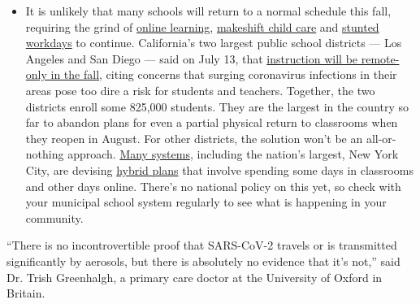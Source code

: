 \begin{itemize}
  \begin{itemize}
  \tightlist
  \item
    It is unlikely that many schools will return to a normal schedule
    this fall, requiring the grind of
    \href{https://www.nytimes3xbfgragh.onion/2020/06/05/us/coronavirus-education-lost-learning.html?action=click\&pgtype=Article\&state=default\&region=MAIN_CONTENT_3\&context=storylines_faq}{online
    learning},
    \href{https://www.nytimes3xbfgragh.onion/2020/05/29/us/coronavirus-child-care-centers.html?action=click\&pgtype=Article\&state=default\&region=MAIN_CONTENT_3\&context=storylines_faq}{makeshift
    child care} and
    \href{https://www.nytimes3xbfgragh.onion/2020/06/03/business/economy/coronavirus-working-women.html?action=click\&pgtype=Article\&state=default\&region=MAIN_CONTENT_3\&context=storylines_faq}{stunted
    workdays} to continue. California's two largest public school
    districts --- Los Angeles and San Diego --- said on July 13, that
    \href{https://www.nytimes3xbfgragh.onion/2020/07/13/us/lausd-san-diego-school-reopening.html?action=click\&pgtype=Article\&state=default\&region=MAIN_CONTENT_3\&context=storylines_faq}{instruction
    will be remote-only in the fall}, citing concerns that surging
    coronavirus infections in their areas pose too dire a risk for
    students and teachers. Together, the two districts enroll some
    825,000 students. They are the largest in the country so far to
    abandon plans for even a partial physical return to classrooms when
    they reopen in August. For other districts, the solution won't be an
    all-or-nothing approach.
    \href{https://bioethics.jhu.edu/research-and-outreach/projects/eschool-initiative/school-policy-tracker/}{Many
    systems}, including the nation's largest, New York City, are
    devising
    \href{https://www.nytimes3xbfgragh.onion/2020/06/26/us/coronavirus-schools-reopen-fall.html?action=click\&pgtype=Article\&state=default\&region=MAIN_CONTENT_3\&context=storylines_faq}{hybrid
    plans} that involve spending some days in classrooms and other days
    online. There's no national policy on this yet, so check with your
    municipal school system regularly to see what is happening in your
    community.
  \end{itemize}
\end{itemize}

``There is no incontrovertible proof that SARS-CoV-2 travels or is
transmitted significantly by aerosols, but there is absolutely no
evidence that it's not,'' said Dr. Trish Greenhalgh, a primary care
doctor at the University of Oxford in Britain.

